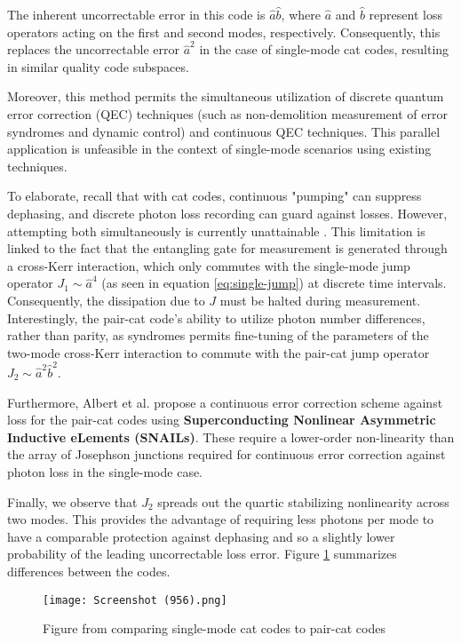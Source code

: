 \documentclass[11pt]{article}
\newcommand\0{\mathbf{0}}
\newcommand\<{\langle}
\renewcommand\>{\rangle}
\begin{document}
The inherent uncorrectable error in this code is $\hat{a}\hat{b}$, where $\hat{a}$ and $\hat{b}$ represent loss operators acting on the first and second modes, respectively. Consequently, this replaces the uncorrectable error $\hat{a}^2$ in the case of single-mode cat codes, resulting in similar quality code subspaces.

Moreover, this method permits the simultaneous utilization of discrete quantum error correction (QEC) techniques (such as non-demolition measurement of error syndromes and dynamic control) and continuous QEC techniques. This parallel application is unfeasible in the context of single-mode scenarios using existing techniques.

To elaborate, recall that with cat codes, continuous "pumping" can suppress dephasing, and discrete photon loss recording can guard against losses. However, attempting both simultaneously is currently unattainable \cite{albert2018multimode}. This limitation is linked to the fact that the entangling gate for measurement is generated through a cross-Kerr interaction, which only commutes with the single-mode jump operator $J_1 \sim \hat{a}^4$ (as seen in equation \ref{eq:single-jump}) at discrete time intervals. Consequently, the dissipation due to $J$ must be halted during measurement. Interestingly, the pair-cat code's ability to utilize photon number differences, rather than parity, as syndromes permits fine-tuning of the parameters of the two-mode cross-Kerr interaction to commute with the pair-cat jump operator $J_2 \sim \hat{a}^2\hat{b}^2$.

Furthermore, Albert et al. propose a continuous error correction scheme against loss for the pair-cat codes using \textbf{Superconducting Nonlinear Asymmetric Inductive eLements (SNAILs)}\cite{frattini20173}. These require a lower-order non-linearity than the array of Josephson junctions required for continuous error correction against photon loss in the single-mode case.

Finally, we observe that $J_2$ spreads out the quartic stabilizing nonlinearity across two modes. This provides the advantage of requiring less photons per mode to have a comparable protection against dephasing and so a slightly lower probability of the leading uncorrectable loss error. Figure \ref{fig:cat} summarizes differences between the codes.

\begin{figure}[h]
\label{fig:cat}
\centering
\texttt{[image: Screenshot (956).png]}	
\caption{Figure from \cite{albert2018multimode} comparing single-mode cat codes to pair-cat codes}
\end{figure}
\end{document}
